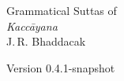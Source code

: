 \begin{titlepage}
\setcounter{page}{1}
{\noindent\fontsize{26pt}{26pt}\upshape Grammatical Suttas of}\\[2\baselineskip]
{\noindent\fontsize{46pt}{46pt}\itshape Kaccāyana}\\[8\baselineskip]
{\LARGE J.\,R. Bhaddacak}\par
{}
{\noindent\ttfamily Version 0.4.1-snapshot}
\end{titlepage}
\endinput
